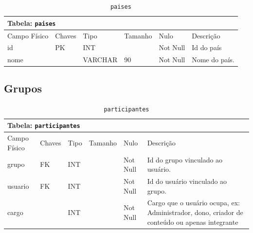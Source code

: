 \documentclass[12pt,a4paper]{article}
\begin{document}
\begin{center}
\begin{table}[h!]
	\caption{\texttt{paises}}
	\label{tabela:paises}
	\begin{tabular}{|p{2.3cm}|p{1.2cm}|p{1.8cm}|p{1.5cm}|p{1cm}|p{6cm}|}\hline	
		\multicolumn{6}{|p{16cm}|}{\cellcolor{cinzaClaro}  \centering Tabela: \texttt{paises}} \\ \hline %
		{\small Campo Físico}   & {\small Chaves} & {\small Tipo} & {\small Tamanho} & {\small Nulo} & {\small Descrição}\\\hline %
		
		{\tiny id} & {\tiny PK} & {\tiny INT} & {\tiny } & {\tiny Not Null} &{\tiny Id do país}\\\hline
		{\tiny nome} & {\tiny } & {\tiny VARCHAR} & {\tiny 90} & {\tiny Not Null} &{\tiny Nome do país.}\\\hline
	
			
	\end{tabular}
\end{table}	
\end{center}

\subsection{Grupos}


\begin{center}
\begin{table}[h!]
	\caption{\texttt{participantes}}
	\label{tabela:participantes}
	\begin{tabular}{|p{2.3cm}|p{1.2cm}|p{1.8cm}|p{1.5cm}|p{1cm}|p{6cm}|}\hline	
		\multicolumn{6}{|p{16cm}|}{\cellcolor{cinzaClaro}  \centering Tabela: \texttt{participantes}} \\ \hline %
		{\small Campo Físico}   & {\small Chaves} & {\small Tipo} & {\small Tamanho} & {\small Nulo} & {\small Descrição}\\\hline %
		
		{\tiny grupo} & {\tiny FK} & {\tiny INT} & {\tiny } & {\tiny Not Null} &{\tiny Id do grupo vinculado ao usuário.}\\\hline
		{\tiny usuario} & {\tiny FK} & {\tiny INT} & {\tiny } & {\tiny Not Null} &{\tiny Id do usuário vinculado ao grupo.}\\\hline
		{\tiny cargo} & {\tiny } & {\tiny INT} & {\tiny } & {\tiny Not Null} &{\tiny Cargo que o usuário ocupa, ex: Administrador, dono, criador de conteúdo ou apenas integrante}\\\hline
			
	\end{tabular}
\end{table}	
\end{center}
\end{document}
